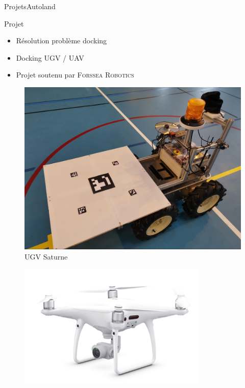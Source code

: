 \begin{frame}{Projets}{Autoland}
    \begin{minipage}{0.48\textwidth}
        \begin{block}{Projet}
            \begin{itemize}
                \item Résolution problème docking \\
                \item Docking UGV / UAV \\
                \item Projet soutenu par \textsc{Forssea Robotics}
            \end{itemize}
        \end{block}
        \begin{figure}
            \includegraphics[width=\textwidth]{images/project_autoland/autoland_ugv.jpg}
            \caption{UGV Saturne}
        \end{figure}
    \end{minipage}
    \hfill
    \begin{minipage}{0.48\textwidth}
        \begin{figure}
            \includegraphics[width=0.8\textwidth]{images/project_autoland/autoland_uav.png}

\end{figure}
\end{minipage}
\end{frame}
